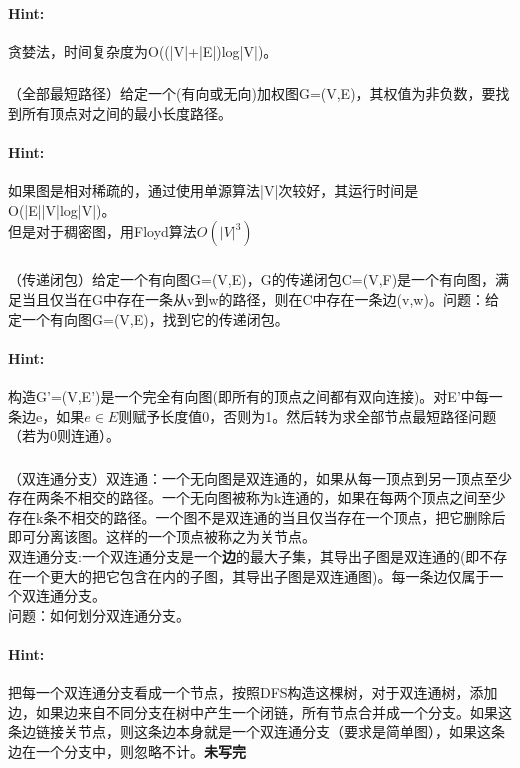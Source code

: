 \documentclass{article}
\begin{document}
     \paragraph{Hint:} 贪婪法，时间复杂度为O((|V|+|E|)log|V|)。
     
       
     \subsubsection{}（全部最短路径）给定一个(有向或无向)加权图G=(V,E)，其权值为非负数，要找到所有顶点对之间的最小长度路径。
     \paragraph{Hint:}如果图是相对稀疏的，通过使用单源算法|V|次较好，其运行时间是O(|E||V|log|V|)。\\
     但是对于稠密图，用Floyd算法$O(|V|^3)$
     
     \subsubsection{}（传递闭包）给定一个有向图G=(V,E)，G的传递闭包C=(V,F)是一个有向图，满足当且仅当在G中存在一条从v到w的路径，则在C中存在一条边(v,w)。问题：给定一个有向图G=(V,E)，找到它的传递闭包。
     \paragraph{Hint:}构造G'=(V,E')是一个完全有向图(即所有的顶点之间都有双向连接)。对E'中每一条边e，如果$e\in E$则赋予长度值0，否则为1。然后转为求全部节点最短路径问题（若为0则连通）。
     
     \subsubsection{}（双连通分支）双连通：一个无向图是双连通的，如果从每一顶点到另一顶点至少存在两条不相交的路径。一个无向图被称为k连通的，如果在每两个顶点之间至少存在k条不相交的路径。一个图不是双连通的当且仅当存在一个顶点，把它删除后即可分离该图。这样的一个顶点被称之为关节点。\\
     双连通分支:一个双连通分支是一个\textbf{边}的最大子集，其导出子图是双连通的(即不存在一个更大的把它包含在内的子图，其导出子图是双连通图)。每一条边仅属于一个双连通分支。\\
     问题：如何划分双连通分支。
     

     \paragraph{Hint:}把每一个双连通分支看成一个节点，按照DFS构造这棵树，对于双连通树，添加边，如果边来自不同分支在树中产生一个闭链，所有节点合并成一个分支。如果这条边链接关节点，则这条边本身就是一个双连通分支（要求是简单图），如果这条边在一个分支中，则忽略不计。\textbf{未写完}
     
\end{document}
